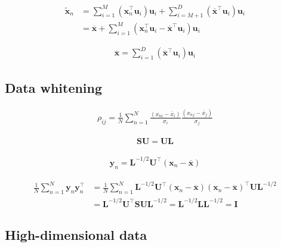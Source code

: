 \documentclass{article}
\begin{document}
\begin{align*}
\widetilde{\mathbf{x}}_{n} & =\sum_{i=1}^{M}\left(\mathbf{x}_{n}^{\top} \mathbf{u}_{i}\right) \mathbf{u}_{i}+\sum_{i=M+1}^{D}\left(\overline{\mathbf{x}}^{\top} \mathbf{u}_{i}\right) \mathbf{u}_{i}  \tag{16.19}\\
& =\overline{\mathbf{x}}+\sum_{i=1}^{M}\left(\mathbf{x}_{n}^{\top} \mathbf{u}_{i}-\overline{\mathbf{x}}^{\top} \mathbf{u}_{i}\right) \mathbf{u}_{i}
 \tag{16.20}
\end{align*}

\begin{align*}
\overline{\mathbf{x}}=\sum_{i=1}^{D}\left(\overline{\mathbf{x}}^{\top} \mathbf{u}_{i}\right) \mathbf{u}_{i} \tag{16.21}
\end{align*}

\subsection{Data whitening}

\begin{align*}
\rho_{i j}=\frac{1}{N} \sum_{n=1}^{N} \frac{\left(x_{n i}-\bar{x}_{i}\right)}{\sigma_{i}} \frac{\left(x_{n j}-\bar{x}_{j}\right)}{\sigma_{j}} \tag{16.22}
\end{align*}

\begin{align*}
\mathbf{S U}=\mathbf{U L} \tag{16.23}
\end{align*}

\begin{align*}
\mathbf{y}_{n}=\mathbf{L}^{-1 / 2} \mathbf{U}^{\top}\left(\mathbf{x}_{n}-\overline{\mathbf{x}}\right) \tag{16.24}
\end{align*}

\begin{align*}
\frac{1}{N} \sum_{n=1}^{N} \mathbf{y}_{n} \mathbf{y}_{n}^{\top} & =\frac{1}{N} \sum_{n=1}^{N} \mathbf{L}^{-1 / 2} \mathbf{U}^{\top}\left(\mathbf{x}_{n}-\overline{\mathbf{x}}\right)\left(\mathbf{x}_{n}-\overline{\mathbf{x}}\right)^{\top} \mathbf{U L}^{-1 / 2} \\
& =\mathbf{L}^{-1 / 2} \mathbf{U}^{\top} \mathbf{S} \mathbf{U} \mathbf{L}^{-1 / 2}=\mathbf{L}^{-1 / 2} \mathbf{L} \mathbf{L}^{-1 / 2}=\mathbf{I}
\tag{16.25}
\end{align*}

\subsection{High-dimensional data}
\end{document}
